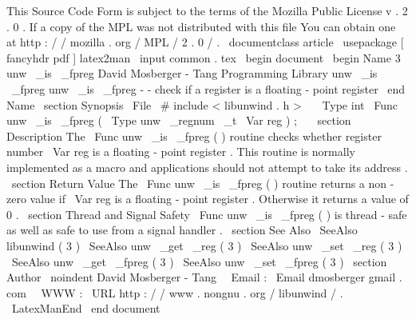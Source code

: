 %
This
Source
Code
Form
is
subject
to
the
terms
of
the
Mozilla
Public
%
License
v
.
2
.
0
.
If
a
copy
of
the
MPL
was
not
distributed
with
this
%
file
You
can
obtain
one
at
http
:
/
/
mozilla
.
org
/
MPL
/
2
.
0
/
.
\
documentclass
{
article
}
\
usepackage
[
fancyhdr
pdf
]
{
latex2man
}
\
input
{
common
.
tex
}
\
begin
{
document
}
\
begin
{
Name
}
{
3
}
{
unw
\
_is
\
_fpreg
}
{
David
Mosberger
-
Tang
}
{
Programming
Library
}
{
unw
\
_is
\
_fpreg
}
unw
\
_is
\
_fpreg
-
-
check
if
a
register
is
a
floating
-
point
register
\
end
{
Name
}
\
section
{
Synopsis
}
\
File
{
\
#
include
<
libunwind
.
h
>
}
\
\
\
Type
{
int
}
\
Func
{
unw
\
_is
\
_fpreg
}
(
\
Type
{
unw
\
_regnum
\
_t
}
\
Var
{
reg
}
)
;
\
\
\
section
{
Description
}
The
\
Func
{
unw
\
_is
\
_fpreg
}
(
)
routine
checks
whether
register
number
\
Var
{
reg
}
is
a
floating
-
point
register
.
This
routine
is
normally
implemented
as
a
macro
and
applications
should
not
attempt
to
take
its
address
.
\
section
{
Return
Value
}
The
\
Func
{
unw
\
_is
\
_fpreg
}
(
)
routine
returns
a
non
-
zero
value
if
\
Var
{
reg
}
is
a
floating
-
point
register
.
Otherwise
it
returns
a
value
of
0
.
\
section
{
Thread
and
Signal
Safety
}
\
Func
{
unw
\
_is
\
_fpreg
}
(
)
is
thread
-
safe
as
well
as
safe
to
use
from
a
signal
handler
.
\
section
{
See
Also
}
\
SeeAlso
{
libunwind
(
3
)
}
\
SeeAlso
{
unw
\
_get
\
_reg
(
3
)
}
\
SeeAlso
{
unw
\
_set
\
_reg
(
3
)
}
\
SeeAlso
{
unw
\
_get
\
_fpreg
(
3
)
}
\
SeeAlso
{
unw
\
_set
\
_fpreg
(
3
)
}
\
section
{
Author
}
\
noindent
David
Mosberger
-
Tang
\
\
Email
:
\
Email
{
dmosberger
gmail
.
com
}
\
\
WWW
:
\
URL
{
http
:
/
/
www
.
nongnu
.
org
/
libunwind
/
}
.
\
LatexManEnd
\
end
{
document
}
